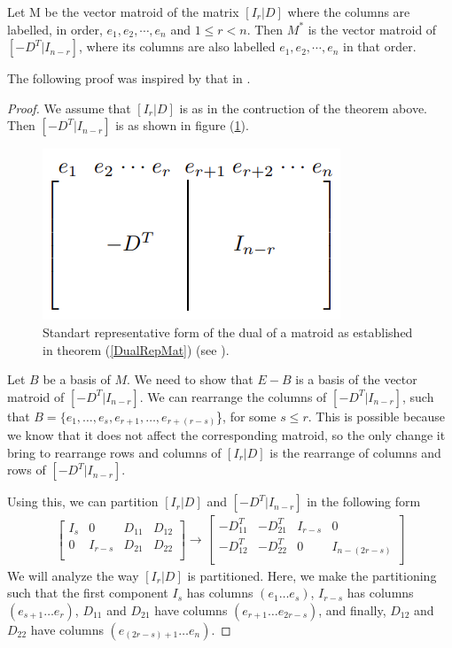 \begin{theorem}\label{DualRepMat}
    Let M be the vector matroid of the matrix $[I_r|D]$ where the columns are labelled, in order, $e_1, e_2,\cdots,e_n$ and $1\leq r< n$. Then $M^*$ is the vector matroid of $[-D^T|I_{n-r}]$, where its columns are also labelled $e_1, e_2,\cdots,e_n$ in that order.
\end{theorem}

The following proof was inspired by that in \cite{oxley1}.

\begin{proof}
    We assume that $[I_r|D]$ is as in the contruction of the theorem above. Then $[-D^T|I_{n-r}]$ is as shown in figure (\ref{MatRepresentationDual}).
    \begin{figure}[h]
        \centering
        \includegraphics{VMRDual.png}
        \caption{Standart representative form of the dual of a matroid as established in theorem (\ref{DualRepMat}) (see \cite{oxley1}).}
        \label{MatRepresentationDual}
    \end{figure}

    Let $B$ be a basis of $M$. We need to show that $E-B$ is a basis of the vector matroid of $[-D^T|I_{n-r}]$. We can rearrange the columns of $[-D^T|I_{n-r}]$, such that $B=\{e_1,\dots,e_s, e_{r+1}, \dots, e_{r+(r-s)}$\}, for some $s \leq r$. This is possible because we know that it does not affect the corresponding matroid, so the only change it bring to rearrange rows and columns of $[I_r|D]$ is the rearrange of columns and rows of $[-D^T|I_{n-r}]$. 
    
    Using this, we can partition $[I_r|D]$ and $[-D^T|I_{n-r}]$ in the following form
    \begin{align*}
    \begin{bmatrix}
    I_s & 0 & D_{11} & D_{12}\\
    0 & I_{r-s} & D_{21} & D_{22}\\
    \end{bmatrix}
         \rightarrow 
    \begin{bmatrix}
    -D_{11}^T & -D_{21}^T & I_{r-s} & 0\\
    -D_{12}^T & -D_{22}^T & 0 & I_{n-(2r-s)}\\
    \end{bmatrix}
    \end{align*}
    We will analyze the way $[I_r|D]$ is partitioned. Here, we make the partitioning such that the first component $I_s$ has columns $(e_1 \dots e_s)$, $I_{r-s}$ has columns $(e_{s+1} \dots e_r)$, $D_11$ and $D_21$ have columns $(e_{r+1} \dots e_{2r-s})$, and finally, $D_{12}$ and $D_{22}$ have columns $(e_{(2r-s)+1} \dots e_n)$.
    

\end{proof}
